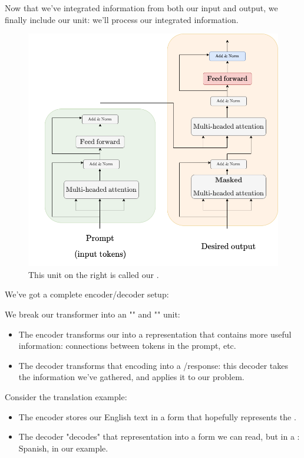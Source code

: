         Now that we've integrated information from both our input and output, we finally include our  unit: we'll process our integrated information.

        \begin{figure}[H]
            \centering
            \includegraphics[width=0.65\linewidth]{images/transformers_images/decoder_feed_forward.png}
            \caption*{This unit on the right is called our .}
        \end{figure}

        We've got a complete encoder/decoder setup:\\

        \begin{concept}
            We break our transformer into an "" and "" unit:

            \begin{itemize}
                \item The encoder transforms our  into a representation that contains more useful information: connections between tokens in the prompt, etc.

                \item The decoder transforms that encoding into a /response: this decoder takes the information we've gathered, and applies it to our problem.
            \end{itemize}
        \end{concept}

        Consider the translation example:
        
        \begin{itemize}
            \item The encoder stores our English text in a form that hopefully represents the .

            \item The decoder "decodes" that representation into a form we can read, but in a : Spanish, in our example.
        \end{itemize}

